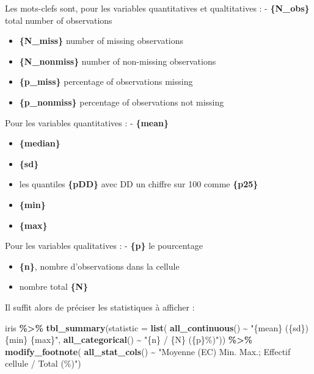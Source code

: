 \documentclass[
]{book}
\newenvironment{Shaded}{\begin{snugshade}}{\end{snugshade}}
\newcommand{\AttributeTok}[1]{\textcolor[rgb]{0.13,0.29,0.53}{#1}}
\newcommand{\FunctionTok}[1]{\textcolor[rgb]{0.13,0.29,0.53}{\textbf{#1}}}
\newcommand{\NormalTok}[1]{#1}
\newcommand{\SpecialCharTok}[1]{\textcolor[rgb]{0.81,0.36,0.00}{\textbf{#1}}}
\newcommand{\StringTok}[1]{\textcolor[rgb]{0.31,0.60,0.02}{#1}}
\begin{document}
Les mots-clefs sont, pour les variables quantitatives et qualtitatives :
- \textbf{\{N\_obs\}} total number of observations

\begin{itemize}
\item
  \textbf{\{N\_miss\}} number of missing observations
\item
  \textbf{\{N\_nonmiss\}} number of non-missing observations
\item
  \textbf{\{p\_miss\}} percentage of observations missing
\item
  \textbf{\{p\_nonmiss\}} percentage of observations not missing
\end{itemize}

Pour les variables quantitatives :
- \textbf{\{mean\}}

\begin{itemize}
\item
  \textbf{\{median\}}
\item
  \textbf{\{sd\}}
\item
  les quantiles \textbf{\{pDD\}} avec DD un chiffre sur 100 comme \textbf{\{p25\}}
\item
  \textbf{\{min\}}
\item
  \textbf{\{max\}}
\end{itemize}

Pour les variables qualitatives :
- \textbf{\{p\}} le pourcentage

\begin{itemize}
\item
  \textbf{\{n\}}, nombre d'observations dans la cellule
\item
  nombre total \textbf{\{N\}}
\end{itemize}

Il suffit alors de préciser les statistiques à afficher :

\begin{Shaded}
\begin{Highlighting}[]
\NormalTok{iris }\SpecialCharTok{\%\textgreater{}\%} \FunctionTok{tbl\_summary}\NormalTok{(}\AttributeTok{statistic =} \FunctionTok{list}\NormalTok{(}
  \FunctionTok{all\_continuous}\NormalTok{() }\SpecialCharTok{\textasciitilde{}} \StringTok{"\{mean\} (\{sd\}) \{min\} \{max\}"}\NormalTok{,}
  \FunctionTok{all\_categorical}\NormalTok{() }\SpecialCharTok{\textasciitilde{}} \StringTok{"\{n\} / \{N\} (\{p\}\%)"}\NormalTok{)) }\SpecialCharTok{\%\textgreater{}\%}
  \FunctionTok{modify\_footnote}\NormalTok{( }\FunctionTok{all\_stat\_cols}\NormalTok{() }\SpecialCharTok{\textasciitilde{}} \StringTok{"Moyenne (EC) Min. Max.; Effectif cellule / Total (\%)"}\NormalTok{)}
\end{Highlighting}
\end{Shaded}
\end{document}
